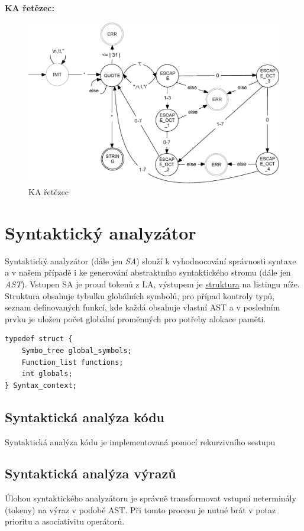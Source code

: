 \documentclass[a4paper,11pt]{article}
\begin{document}
\newpage
\textbf{KA řetězec:} %
\begin{figure}[H]
\centering
\includegraphics[scale=.31]{FSM_STRING.eps}
\caption{KA řetězec}
\end{figure}



\section{Syntaktický analyzátor}
Syntaktický analyzátor (dále jen \textit{SA}) slouží k vyhodnocování správnosti syntaxe a v našem případě i ke generování abstraktního syntaktického stromu (dále jen \textit{AST}). Vstupen SA je proud tokenů z LA, výstupem je \hyperref[lst:saOut]{struktura} na listingu níže. Struktura obsahuje tybulku globálních symbolů, pro případ kontroly typů, seznam definovaných funkcí, kde každá obsahuje vlastní AST a v posledním prvku je uložen počet globální proměnných pro potřeby alokace paměti.

\begin{lstlisting}[caption={Výstupní struktura SA}, label={lst:saOut}]
typedef struct {
	Symbo_tree global_symbols;
	Function_list functions;
	int globals;
} Syntax_context;
\end{lstlisting}

\subsection{Syntaktická analýza kódu}
Syntaktická analýza kódu je implementovaná pomocí rekurzivního sestupu

\subsection{Syntaktická analýza výrazů}
Úlohou syntaktického analyzátoru je správně transformovat vstupní neterminály (tokeny) na výraz v podobě AST. Při tomto procesu je nutné brát v potaz prioritu a asociativitu operátorů.
\end{document}
